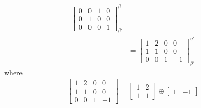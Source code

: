 \begin{solution}
\begin{align*}
\begin{bmatrix}
0 & 0 & 1 & 0 \\
0 & 1 & 0 & 0 \\
0 & 0 & 0 & 1
\end{bmatrix}_{\beta'}^\beta \\
&=
\begin{bmatrix}
1 & 2 & 0 & 0 \\
1 & 1 & 0 & 0 \\
0 & 0 & 1 & -1
\end{bmatrix}_{\beta'}^{\eta'}
\end{align*}
where
\begin{align*}
\begin{bmatrix}
1 & 2 & 0 & 0 \\
1 & 1 & 0 & 0 \\
0 & 0 & 1 & -1
\end{bmatrix} =
\begin{bmatrix}
1 & 2 \\
1 & 1
\end{bmatrix}
\oplus 
\begin{bmatrix}
1 & -1
\end{bmatrix}
\end{align*}
\end{solution}

